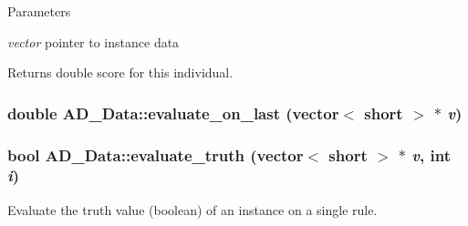 \begin{DoxyParams}{Parameters}
\item[{\em vector}]pointer to instance data \end{DoxyParams}
\begin{DoxyReturn}{Returns}
double score for this individual. 
\end{DoxyReturn}
\hypertarget{classAD__Data_a579358913b3809af2c7eed5df350d4da}{
\subsubsection[{evaluate\_\-on\_\-last}]{\setlength{\rightskip}{0pt plus 5cm}double AD\_\-Data::evaluate\_\-on\_\-last (vector$<$ short $>$ $\ast$ {\em v})}}
\label{classAD__Data_a579358913b3809af2c7eed5df350d4da}
\hypertarget{classAD__Data_a69c88748173e40b02bf2982716a0c324}{
\subsubsection[{evaluate\_\-truth}]{\setlength{\rightskip}{0pt plus 5cm}bool AD\_\-Data::evaluate\_\-truth (vector$<$ short $>$ $\ast$ {\em v}, \/  int {\em i})}}
\label{classAD__Data_a69c88748173e40b02bf2982716a0c324}
Evaluate the truth value (boolean) of an instance on a single rule.


